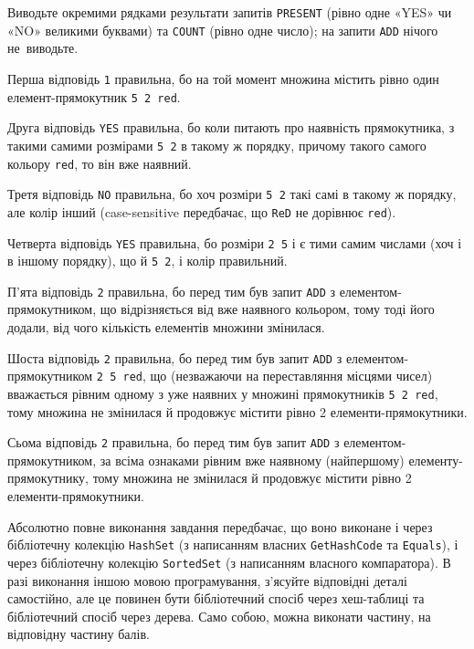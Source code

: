 \OutputFile

Виводьте окремими рядками результати запитів {\tt PRESENT} (рівно одне «YES» чи «NO» великими буквами) та {\tt COUNT} (рівно одне число); на запити {\tt ADD} нічого не~виводьте.


\Examples

\begin{example}
\end{example}

\Note

Перша відповідь {\tt 1} правильна, бо на той момент множина містить рівно один елемент-прямокутник {\tt 5 2 red}.

Друга відповідь {\tt YES} правильна, бо коли питають про наявність прямокутника, з такими самими розмірами {\tt 5 2} в такому ж порядку, причому такого самого кольору {\tt red}, то він вже наявний.

Третя відповідь {\tt NO} правильна, бо хоч розміри {\tt 5 2} такі самі в такому ж порядку, але колір інший (case-sensitive передбачає, що {\tt ReD} не дорівнює {\tt red}).

Четверта відповідь {\tt YES} правильна, бо розміри {\tt 2 5} і є тими самим числами (хоч і в іншому порядку), що й {\tt 5 2}, і колір правильний.

П'ята відповідь {\tt 2} правильна, бо перед тим був запит {\tt ADD} з елементом-прямокутником, що відрізняється від вже наявного кольором, тому тоді його додали, від чого кількість елементів множини змінилася.

Шоста відповідь {\tt 2} правильна, бо перед тим був запит {\tt ADD} з елементом-прямокутником {\tt 2 5 red}, що (незважаючи на переставляння місцями чисел) вважається рівним одному з уже наявних у множині прямокутників {\tt 5 2 red}, тому множина не змінилася й продовжує містити рівно 2 елементи-прямокутники.

Сьома відповідь {\tt 2} правильна, бо перед тим був запит {\tt ADD} з елементом-прямокутником, за всіма ознаками рівним вже наявному (найпершому) елементу-прямокутнику, тому множина не змінилася й продовжує містити рівно 2 елементи-прямокутники.

Абсолютно повне виконання завдання передбачає, що воно виконане і через бібліотечну колекцію {\tt HashSet} (з написанням власних {\tt GetHashCode} та {\tt Equals}), і через бібліотечну колекцію {\tt SortedSet} (з написанням власного компаратора). В разі виконання іншою мовою програмування, з'ясуйте відповідні деталі самостійно, але це повинен бути бібліотечний спосіб через хеш-таблиці та бібліотечний спосіб через дерева. Само собою, можна виконати частину, на відповідну частину балів. 


